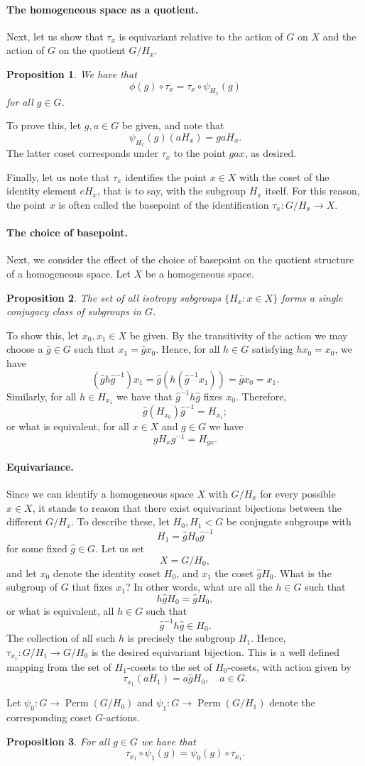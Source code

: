 \documentclass[12pt]{article}
\newtheorem{proposition}{Proposition}
\newcommand{\Perm}{\operatorname{Perm}}
\newcommand{\hg}{\hat{g}}
\begin{document}
\paragraph{The homogeneous space as a quotient.}  Next, let us show
that $\tau_{x}$ is equivariant relative to the action of $G$ on $X$
and the action of $G$ on the quotient $G/H_x$. 
\begin{proposition}
We have that
$$\phi(g)\circ\tau_x = \tau_x\circ\psi_{H_x}(g)$$
for all $g\in G$.
\end{proposition}
To prove this, let $g,a\in G$ be given, and note that
$$\psi_{H_x}(g)(aH_x)=gaH_x.$$
The latter coset corresponds under $\tau_{x}$ to the
point $gax$, as desired.

Finally, let us note that $\tau_x$ identifies the point $x\in X$ with
the coset of the identity element $eH_x$, that is to say, with the
subgroup $H_x$ itself.  For this reason, the point $x$ is often called
the basepoint of the identification $\tau_x: G/H_x \to X$.

\paragraph{The choice of basepoint.}
Next, we consider the effect of the choice of basepoint on the
quotient structure of a homogeneous space.  Let $X$ be a homogeneous
space. 
\begin{proposition}
The set of all isotropy subgroups $\{ H_x : x\in X\}$ forms a
single conjugacy class of subgroups in $G$.    
\end{proposition}
To show this, let $x_0,
x_1\in X$ be given.  By the transitivity of the action we may choose a
$\hg\in G$ such that $x_1 = \hg x_0$.  Hence, for all $h\in G$
satisfying $hx_0 = x_0$, we have
$$(\hg h \hg^{-1}) x_1 = \hg (h ( \hg^{-1} x_1)) = \hg x_0 = x_1.$$
Similarly, for all $h\in H_{x_1}$ we have that $\hg^{-1} h \hg$ fixes $x_0$.
Therefore,
$$\hg (H_{x_0}) \hg^{-1} = H_{x_1};$$
or what is equivalent, for all $x\in X$ and $g\in G$ we have
$$g H_x g^{-1} = H_{gx}.$$

\paragraph{Equivariance.}
Since we can identify a homogeneous space $X$ with $G/H_x$ for every
possible $x\in X$, it stands to reason that there exist equivariant
bijections between the different $G/H_x$.  To  describe these, let
$H_0, H_1<G$ be conjugate subgroups with
$$H_1 = \hg H_0 \hg^{-1}$$
for some fixed $\hg\in G$.  Let us set
$$X=G/H_0,$$
and let $x_0$ denote the identity coset $H_0$, and $x_1$
the coset $\hg H_0$.  What is the subgroup of $G$ that fixes $x_1$?
In other words, what are all the $h\in G$ such that
$$h  \hg H_0 = \hg H_0,$$
or what is equivalent, all $h\in G$ such that
$$\hg^{-1} h \hg \in H_0.$$
The collection of all such $h$ is
precisely the subgroup $H_1$.  Hence, $\tau_{x_1}: G/H_1\to G/H_0$ is
the desired equivariant bijection.  This is a well defined mapping
from the set of $H_1$-cosets to the set of $H_0$-cosets, with action
given by
$$\tau_{x_1}(a H_1)=a \hg H_0,\quad a\in G.$$

Let $\psi_0:
G\to \Perm(G/H_0)$ and $\psi_1:G\to \Perm(G/H_1)$ denote the
corresponding coset $G$-actions.  
\begin{proposition}
  For all $g\in G$ we have that
  $$\tau_{x_1}\circ\psi_1(g)  =  \psi_0(g)\circ \tau_{x_1}.$$
  \end{proposition}
\end{document}
